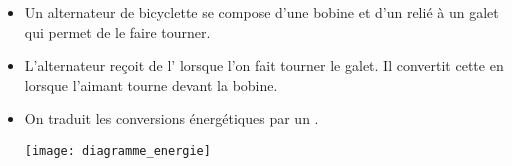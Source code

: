 \begin{mybilan}
	\begin{itemize}
		\item Un alternateur de bicyclette  se compose d'une bobine et d'un  relié à un galet qui permet de le faire tourner.
		\item L'alternateur reçoit de l' lorsque l'on fait tourner le galet. Il convertit cette  en  lorsque l'aimant tourne devant la bobine.
		\item On traduit les conversions énergétiques par un .
		
		\begin{center}
			\texttt{[image: diagramme\_energie]}
		\end{center}
	\end{itemize}
\end{mybilan}